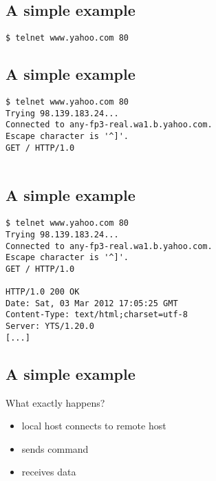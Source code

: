 \documentclass[xga]{xdvislides}
\begin{document}
\subsection{A simple example}
\Hugesize
\begin{center}
\begin{verbatim}
$ telnet www.yahoo.com 80
\end{verbatim}
\end{center}
\Normalsize
\vspace*{\fill}

\subsection{A simple example}
\Hugesize
\begin{center}
\begin{verbatim}
$ telnet www.yahoo.com 80
Trying 98.139.183.24...
Connected to any-fp3-real.wa1.b.yahoo.com.
Escape character is '^]'.
GET / HTTP/1.0


\end{verbatim}
\end{center}
\Normalsize
\vspace*{\fill}

\subsection{A simple example}
\Hugesize
\begin{center}
\begin{verbatim}
$ telnet www.yahoo.com 80
Trying 98.139.183.24...
Connected to any-fp3-real.wa1.b.yahoo.com.
Escape character is '^]'.
GET / HTTP/1.0

HTTP/1.0 200 OK
Date: Sat, 03 Mar 2012 17:05:25 GMT
Content-Type: text/html;charset=utf-8
Server: YTS/1.20.0
[...]
\end{verbatim}
\end{center}
\Normalsize
\vspace*{\fill}


\subsection{A simple example}
What exactly happens?
\\
\begin{itemize}
	\item local host connects to remote host
	\item sends command
	\item receives data
\end{itemize}
\end{document}
